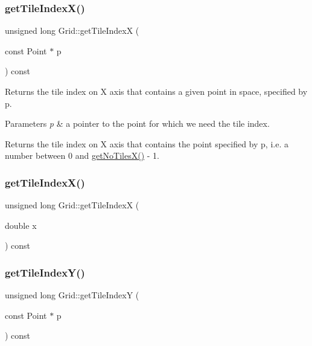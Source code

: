 \subsubsection{\texorpdfstring{getTileIndexX()}{getTileIndexX()}\hspace{0.1cm}{\footnotesize\ttfamily [1/2]}}
{\footnotesize\ttfamily unsigned long Grid\+::get\+Tile\+IndexX (\begin{DoxyParamCaption}\item[{const Point $\ast$}]{p }\end{DoxyParamCaption}) const}

Returns the tile index on X axis that contains a given point in space, specified by p. 
\begin{DoxyParams}{Parameters}
{\em p} & a pointer to the point for which we need the tile index. \\
\hline
\end{DoxyParams}
\begin{DoxyReturn}{Returns}
the tile index on X axis that contains the point specified by p, i.\+e. a number between 0 and \mbox{\hyperlink{class_grid_af29c0c404a908aa46f83afb17d7609a6}{get\+No\+Tiles\+X()}} -\/ 1. 
\end{DoxyReturn}
\mbox{\label{class_grid_a5ab67c336ac08c690a0e8b03c12f02e5}} 
\subsubsection{\texorpdfstring{getTileIndexX()}{getTileIndexX()}\hspace{0.1cm}{\footnotesize\ttfamily [2/2]}}
{\footnotesize\ttfamily unsigned long Grid\+::get\+Tile\+IndexX (\begin{DoxyParamCaption}\item[{double}]{x }\end{DoxyParamCaption}) const}

\mbox{\label{class_grid_ae1eeb3b42007ae1cf19cfaf0d846fb9a}} 
\subsubsection{\texorpdfstring{getTileIndexY()}{getTileIndexY()}\hspace{0.1cm}{\footnotesize\ttfamily [1/2]}}
{\footnotesize\ttfamily unsigned long Grid\+::get\+Tile\+IndexY (\begin{DoxyParamCaption}\item[{const Point $\ast$}]{p }\end{DoxyParamCaption}) const}

